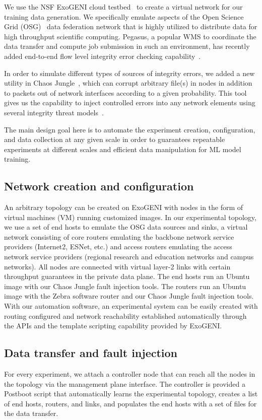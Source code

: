 We use the NSF ExoGENI cloud testbed~\cite{ExoGENI:web} to create a virtual network for our training data generation. We specifically emulate aspects of the Open Science Grid (OSG)~\cite{OSG:web} data federation network that is highly utilized to distribute data for high throughput scientific computing. Pegasus, a popular WMS to coordinate the data transfer and compute job submission in such an environment, has recently added end-to-end flow level integrity error checking capability~\cite{swip:pearc:2019}.    

In order to simulate different types of sources of integrity errors, we added a new utility in Chaos Jungle~\cite{swip:pearc:2019,chaosjungle:web}, which can corrupt arbitrary file(s) in nodes in addition to packets out of network interfaces according to a given probability. This tool gives us the capability to inject controlled errors into any network elements using several integrity threat models~\cite{threat-model}.

The main design goal here is to automate the experiment creation, configuration, and data collection at any given scale in order to guarantees repeatable experiments at different scales and efficient data manipulation for ML model training.

\subsection{Network creation and configuration}
An arbitrary topology can be created on ExoGENI with nodes in the form of virtual machines (VM) running customized images. In our experimental topology, we use a set of end hosts to emulate the OSG data sources and sinks, a virtual network consisting of core routers emulating the backbone network service providers (Internet2, ESNet, etc.) and access routers emulating the access network service providers (regional research and education networks and campus networks). All nodes are connected with virtual layer-2 links with certain throughput guarantees in the private data plane. The end hosts run an Ubuntu image with our Chaos Jungle fault injection tools. The routers run an Ubuntu image with the Zebra software router and our Chaos Jungle fault injection tools. With our automation software, an experimental system can be easily created with routing configured and network reachability established automatically through the APIs and the template scripting capability provided by ExoGENI.   

\subsection{Data transfer and fault injection}
For every experiment, we attach a controller node that can reach all the nodes in the topology via the management plane interface. The controller is provided a Postboot script that automatically learns the experimental topology, creates a list of end hosts, routers, and links, and populates the end hosts with a set of files for the data transfer.

